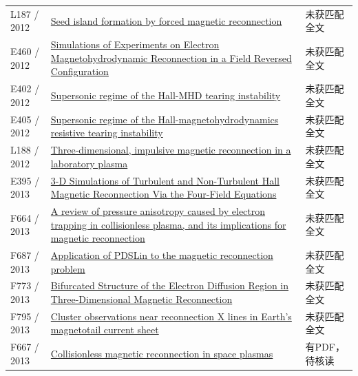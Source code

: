 \begin{longtable}{P{24mm}P{97mm}P{27mm}}
L187 / 2012 & \href{https://doi.org/10.1088/0029-5515/52/6/063020}{Seed island formation by forced magnetic reconnection} & 未获匹配全文\\

E460 / 2012 & \href{http://absimage.aps.org/image/TSF12/MWS_TSF12-2012-000189.pdf}{Simulations of Experiments on Electron Magnetohydrodynamic Reconnection in a Field Reversed Configuration} & 未获匹配全文\\

E402 / 2012 & \href{http://absimage.aps.org/image/APR12/MWS_APR12-2012-000859.pdf}{Supersonic regime of the Hall-MHD tearing instability} & 未获匹配全文\\

E405 / 2012 & \href{https://doi.org/10.1063/1.4739787}{Supersonic regime of the Hall-magnetohydrodynamics resistive tearing instability} & 未获匹配全文\\

L188 / 2012 & \href{https://doi.org/10.1029/2012gl054574}{Three‐dimensional,  impulsive magnetic reconnection in a laboratory plasma} & 未获匹配全文\\

E395 / 2013 & \href{https://ui.adsabs.harvard.edu/abs/2013shin.confE..78D/abstract}{3-D Simulations of Turbulent and Non-Turbulent Hall Magnetic Reconnection Via the Four-Field Equations} & 未获匹配全文\\

F664 / 2013 & \href{https://doi.org/10.1063/1.4811092}{A review of pressure anisotropy caused by electron trapping in collisionless plasma,  and its implications for magnetic reconnection} & 未获匹配全文\\

F687 / 2013 & \href{https://doi.org/10.1088/1749-4699/6/1/014002}{Application of PDSLin to the magnetic reconnection problem} & 未获匹配全文\\

F773 / 2013 & \href{https://doi.org/10.1103/physrevlett.110.265004}{Bifurcated Structure of the Electron Diffusion Region in Three-Dimensional Magnetic Reconnection} & 未获匹配全文\\

F795 / 2013 & \href{https://doi.org/10.1002/jgra.50403}{Cluster observations near reconnection X lines in Earth's magnetotail current sheet} & 未获匹配全文\\

F667 / 2013 & \href{https://doi.org/10.3389/fphy.2013.00031}{Collisionless magnetic reconnection in space plasmas} & 有PDF，待核读\\


\end{longtable}
